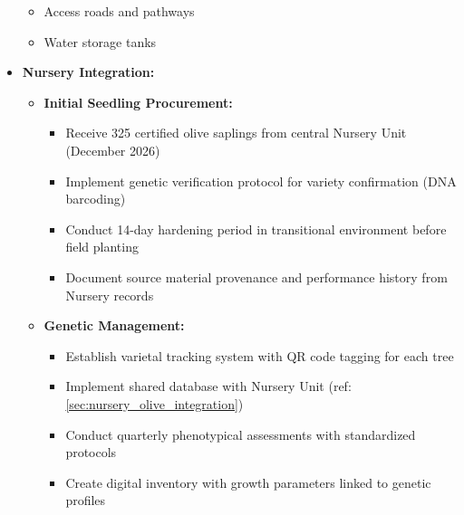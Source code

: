 \begin{itemize}
\begin{itemize}
        \item Access roads and pathways
        \item Water storage tanks
    \end{itemize}
    \item \textbf{Nursery Integration:} \label{sec:olive_nursery_integration}
    \begin{itemize}
        \item \textbf{Initial Seedling Procurement:}
        \begin{itemize}
            \item Receive 325 certified olive saplings from central Nursery Unit (December 2026)
            \item Implement genetic verification protocol for variety confirmation (DNA barcoding)
            \item Conduct 14-day hardening period in transitional environment before field planting
            \item Document source material provenance and performance history from Nursery records
        \end{itemize}
        \item \textbf{Genetic Management:}
        \begin{itemize}
            \item Establish varietal tracking system with QR code tagging for each tree
            \item Implement shared database with Nursery Unit (ref: \ref{sec:nursery_olive_integration})
            \item Conduct quarterly phenotypical assessments with standardized protocols
            \item Create digital inventory with growth parameters linked to genetic profiles
        \end{itemize}
    \end{itemize}
\end{itemize}

